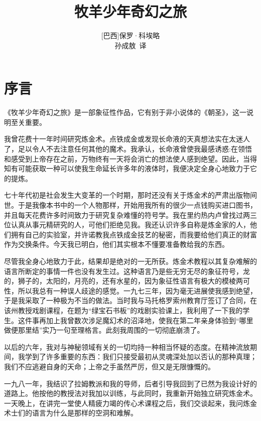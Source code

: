 \documentclass[twoside,openany]{book}
\title{牧羊少年奇幻之旅}
\author{[巴西]保罗·科埃略\\ 孙成敖\ 译}
\date{}
\begin{document}
\maketitle
\tableofcontents

\noindent
\chapter*{序言}

《牧羊少年奇幻之旅》是一部象征性作品，它有别于非小说体的《朝圣》，这一说明至关重要。

我曾花费十一年时间研究炼金术。点铁成金或发现长命液的天真想法实在太迷人了，足以令人不去注意任何其他的魔术。我承认，长命液曾使我最感诱惑:在领悟和感受到上帝存在之前，万物终有一天将会消亡的想法使人感到绝望。因此，当得知有可能获取一种可以使我生命延长许多年的液体时，我便决定全身心地致力于它的提炼。

七十年代初是社会发生大变革的一个时期，那时还没有关于炼金术的严肃出版物间世。于是我像本书中的一个人物那样，开始用我所有的很少一点钱购买进口图书，并且每天花费许多时间致力于研究复杂难懂的符号学。我在里约热内卢曾找过两三位认真从事元精研究的人，可他们拒绝见我。我还认识许多自称是炼金家的人，他们拥有自己的实验室，并许诺教我点铁成金技艺的秘密，而我要给他们真正的财富作为交换条件。今天我已明白，他们其实根本不懂要准备教给我的东西。

尽管我全身心地致力于此，结果却是绝对的一无所获。炼金术教程以其复杂难解的语言所断定的事情一件也没有发生过。这种语言乃是些无穷无尽的象征符号，龙的，狮子的，太阳的，月亮的，还有水星的，因为象征性语言有极大的模棱两可性，所以我总有一种误人歧途的感觉。一九七三年，因为毫无进展使我感到绝望，于是我采取了一种极为不当的做法。当时我与马托格罗索州教育厅签订了合同，在该州教授戏剧课程，在题为“绿宝石书板”的戏剧实验课上，我利用了一下我的学生。这件事再加上我曾数次涉足魔幻术的沼泽地，使我在第二年亲身体验到“哪里做便那里结”实乃一句至理格言。此刻我周围的一切彻底崩溃了。

以后的六年，我对与神秘领域有关的一切均持一种相当怀疑的态度。在精神流放期间，我学到了许多重要的东西：我们只接受最初从灵魂深处加以否认的那种真理；我们不应逃避自身的天命；上帝之手虽然严厉，但又是无限慷慨的。

一九八一年，我结识了拉姆教派和我的导师，后者引导我回到了已然为我设计好的道路上。他按他的教授法对我加以训练，与此同时，我重新开始独立研究炼金术。一天晚上，在讲完一堂使人精疲力竭的传心术课程之后，我们交谈起来，我问炼金术士们的语言为什么是那样的空洞和难解。
\end{document}
